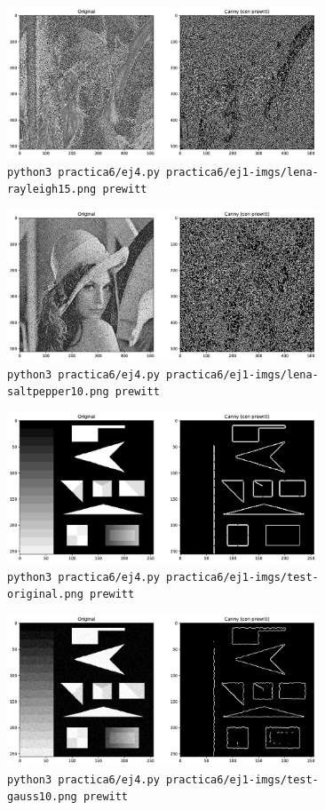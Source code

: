 \documentclass[11pt, spanish]{article}
\begin{document}
\begin{figure}[H]
\centering
    \includegraphics[height=4.5cm]{informe-imgs/ej4-prewitt-lena-rayleigh15.jpg}
    \caption{\texttt{python3 practica6/ej4.py practica6/ej1-imgs/lena-rayleigh15.png prewitt}}
\end{figure}

\begin{figure}[H]
\centering
    \includegraphics[height=4.5cm]{informe-imgs/ej4-prewitt-lena-saltpepper10.jpg}
    \caption{\texttt{python3 practica6/ej4.py practica6/ej1-imgs/lena-saltpepper10.png prewitt}}
\end{figure}


\begin{figure}[H]
\centering
    \includegraphics[height=4.5cm]{informe-imgs/ej4-prewitt-test-original.jpg}
    \caption{\texttt{python3 practica6/ej4.py practica6/ej1-imgs/test-original.png prewitt}}
\end{figure}

\begin{figure}[H]
\centering
    \includegraphics[height=4.5cm]{informe-imgs/ej4-prewitt-test-gauss10.jpg}
    \caption{\texttt{python3 practica6/ej4.py practica6/ej1-imgs/test-gauss10.png prewitt}}
\end{figure}
\end{document}

